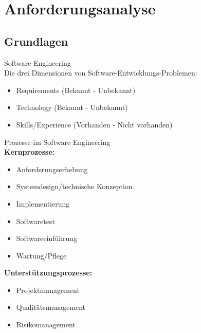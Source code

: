 \section{Anforderungsanalyse}

\subsection{Grundlagen}

\begin{concept}{Software Engineering}\\
Die drei Dimensionen von Software-Entwicklungs-Problemen:
\begin{itemize}
    \item Requirements (Bekannt - Unbekannt)
    \item Technology (Bekannt - Unbekannt)
    \item Skills/Experience (Vorhanden - Nicht vorhanden)
\end{itemize}
\end{concept}

\begin{definition}{Prozesse im Software Engineering}\\
\textbf{Kernprozesse:}
\begin{itemize}
    \item Anforderungserhebung
    \item Systemdesign/technische Konzeption
    \item Implementierung
    \item Softwaretest
    \item Softwareeinführung
    \item Wartung/Pflege
\end{itemize}

\textbf{Unterstützungsprozesse:}
\begin{itemize}
    \item Projektmanagement
    \item Qualitätsmanagement
    \item Risikomanagement
\end{itemize}
\end{definition}

